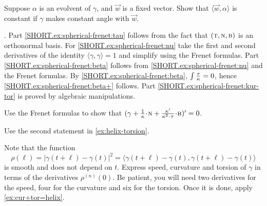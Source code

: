 Suppose $\alpha$ is an evolvent of $\gamma$, and $\vec w$ is a fixed vector.
Show that $\langle \vec w,\alpha\rangle$ is constant if $\gamma$ makes constant angle with $\vec w$.

\parbf{\ref{ex:spherical-frenet}}.
Part \ref{SHORT.ex:spherical-frenet:tau} follows from the fact that $(  \text{\sc{t}},\text{\sc{n}},\text{\sc{b}})$ is an orthonormal basis.
For \ref{SHORT.ex:spherical-frenet:nu} take the first and second derivatives of the identity $\langle\gamma,\gamma\rangle=1$ and simplify using the Frenet formulas.
Part \ref{SHORT.ex:spherical-frenet:beta} follows from \ref{SHORT.ex:spherical-frenet:nu} and the Frenet formulas.
By \ref{SHORT.ex:spherical-frenet:beta}, $\int\tfrac{\tau}{\kappa}=0$, hence \ref{SHORT.ex:spherical-frenet:beta+} follows.
Part \ref{SHORT.ex:spherical-frenet:kur-tor} is proved by algebraic manipulations.

Use the Frenet formulas to show that $(\gamma+\tfrac1\kur\cdot \norm+\tfrac{\kur'}{\kur^2\cdot\tor}\cdot\bi)'=0$.



 Use the second statement in \ref{ex:helix-torsion}.

 Note that the function
\[\rho(\ell)=|\gamma(t+\ell)-\gamma(t)|^2=\langle \gamma(t+\ell)-\gamma(t),\gamma(t+\ell)-\gamma(t)\rangle\] 
is smooth and does not depend on $t$.
Express speed, curvature and torsion of $\gamma$ in terms of the derivatives $\rho^{(n)}(0)$.
Be patient, you will need two derivatives for the speed,
four for the curvature and six for the torsion.
Once it is done, apply \ref{ex:cur+tor=helix}.
